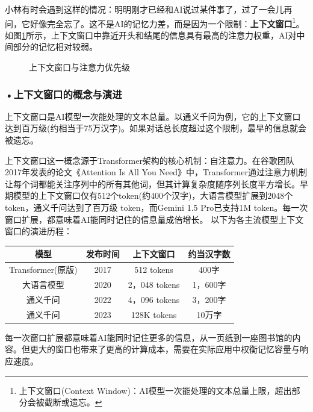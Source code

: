小林有时会遇到这样的情况：明明刚才已经和AI说过某件事了，过了一会儿再问，它好像完全忘了。这不是AI的记忆力差，而是因为一个限制：\textbf{上下文窗口}\footnote{上下文窗口(Context Window)：AI模型一次能处理的文本总量上限，超出部分会被截断或遗忘。}。 如图\ref{fig:ch3_3_6}所示，上下文窗口中靠近开头和结尾的信息具有最高的注意力权重，AI对中间部分的记忆相对较弱。

\begin{figure}[H]
\centering
{}
\caption{上下文窗口与注意力优先级}
\label{fig:ch3_3_6}
\end{figure}

\subsubsection*{\textbf{•上下文窗口的概念与演进}}


上下文窗口是AI模型一次能处理的文本总量。以通义千问为例，它的上下文窗口达到百万级(约相当于75万汉字)。如果对话总长度超过这个限制，最早的信息就会被遗忘。


\vfill
\begin{knowledgebox}
上下文窗口这一概念源于Transformer架构的核心机制：自注意力。在谷歌团队2017年发表的论文《Attention Is All You Need》中，Transformer通过注意力机制让每个词都能关注序列中的所有其他词，但其计算复杂度随序列长度平方增长。早期模型的上下文窗口仅有512个token(约400个汉字)，大语言模型扩展到2048个token，通义千问达到了百万级 token，而Gemini 1.5 Pro已支持1M token。每一次窗口扩展，都意味着AI能同时记住的信息量成倍增长。
以下为各主流模型上下文窗口的演进历程：

\begin{formalTable}[H]
\caption{主流大模型上下文窗口演进}
\label{tab:ch3_02_context_window}
\begin{tabular}{c c c c}
\toprule
\bfseries 模型 & \bfseries 发布时间 & \bfseries 上下文窗口 & \bfseries 约当汉字数 \\ \midrule
Transformer(原版) & 2017 & 512 tokens & 400字 \\
大语言模型 & 2020 & 2，048 tokens & 1，600字 \\
通义千问 & 2022 & 4，096 tokens & 3，200字 \\
通义千问 & 2023 & 128K tokens & 10万字 \\
\end{tabular}
\end{formalTable}

每一次窗口扩展都意味着AI能同时记住更多的信息，从一页纸到一座图书馆的内容。但更大的窗口也带来了更高的计算成本，需要在实际应用中权衡记忆容量与响应速度。
\end{knowledgebox}
\vspace{1em}



